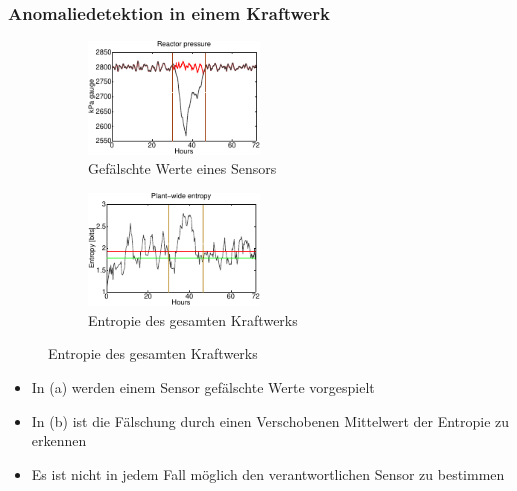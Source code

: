 \documentclass{sikslides}
\begin{document}
    \begin{frame}
        \frametitle{Anomaliedetektion in einem Kraftwerk}
        \begin{figure}
            \centering
            \begin{subfigure}{0.49\textwidth}
                \includegraphics[height=3cm]{../figure/entropy_a}
                \caption{Gefälschte Werte eines Sensors}
                \label{entropy_a}
            \end{subfigure}
            \begin{subfigure}{0.49\textwidth}
                \includegraphics[height=3cm]{../figure/entropy_b}
                \caption{Entropie des gesamten Kraftwerks}
                \label{entropy_b}
            \end{subfigure}
        \end{figure}

        \begin{itemize}[<+->]
            \item In (a) werden einem Sensor gefälschte Werte vorgespielt
            \item In (b) ist die Fälschung durch einen Verschobenen Mittelwert der Entropie zu erkennen
            \item Es ist nicht in jedem Fall möglich den verantwortlichen Sensor zu bestimmen
        \end{itemize}
    \end{frame}
\end{document}
